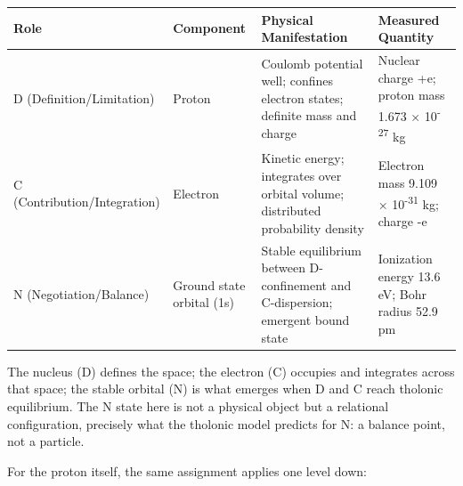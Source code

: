 \documentclass[12pt]{article}
\begin{document}
\begin{longtable}[]{@{}
  >{\raggedright\arraybackslash}p{}
  >{\raggedright\arraybackslash}p{}
  >{\raggedright\arraybackslash}p{}
  >{\raggedright\arraybackslash}p{}@{}}
\toprule\noalign{}
\begin{minipage}[b]{\linewidth}\raggedright
Role
\end{minipage} & \begin{minipage}[b]{\linewidth}\raggedright
Component
\end{minipage} & \begin{minipage}[b]{\linewidth}\raggedright
Physical Manifestation
\end{minipage} & \begin{minipage}[b]{\linewidth}\raggedright
Measured Quantity
\end{minipage} \\
\midrule\noalign{}
\endhead
\bottomrule\noalign{}
\endlastfoot
D (Definition/Limitation) & Proton & Coulomb potential well; confines
electron states; definite mass and charge & Nuclear charge +e; proton
mass 1.673 × 10\textsuperscript{-27} kg \\
C (Contribution/Integration) & Electron & Kinetic energy; integrates
over orbital volume; distributed probability density & Electron mass
9.109 × 10\textsuperscript{-31} kg; charge -e \\
N (Negotiation/Balance) & Ground state orbital (1s) & Stable equilibrium
between D-confinement and C-dispersion; emergent bound state &
Ionization energy 13.6 eV; Bohr radius 52.9 pm \\
\end{longtable}

The nucleus (D) defines the space; the electron (C) occupies and
integrates across that space; the stable orbital (N) is what emerges
when D and C reach tholonic equilibrium. The N state here is not a
physical object but a relational configuration, precisely what the
tholonic model predicts for N: a balance point, not a particle.

For the proton itself, the same assignment applies one level down:
\end{document}
